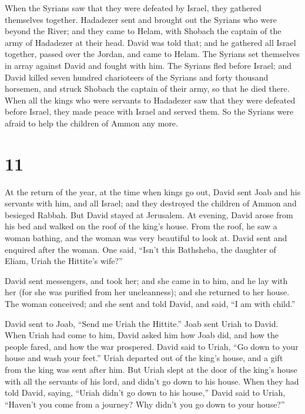  When the Syrians saw that they were defeated by Israel,
they gathered themselves together.  Hadadezer sent and
brought out the Syrians who were beyond the River; and they came to
Helam, with Shobach the captain of the army of Hadadezer at their head.
 David was told that; and he gathered all Israel together,
passed over the Jordan, and came to Helam. The Syrians set themselves in
array against David and fought with him.  The Syrians fled
before Israel; and David killed seven hundred charioteers of the Syrians
and forty thousand horsemen, and struck Shobach the captain of their
army, so that he died there.  When all the kings who were
servants to Hadadezer saw that they were defeated before Israel, they
made peace with Israel and served them. So the Syrians were afraid to
help the children of Ammon any more.

\hypertarget{section-10}{%
\section{11}\label{section-10}}

 At the return of the year, at the time when kings go out,
David sent Joab and his servants with him, and all Israel; and they
destroyed the children of Ammon and besieged Rabbah. But David stayed at
Jerusalem.  At evening, David arose from his bed and walked
on the roof of the king's house. From the roof, he saw a woman bathing,
and the woman was very beautiful to look at.  David sent and
enquired after the woman. One said, ``Isn't this Bathsheba, the daughter
of Eliam, Uriah the Hittite's wife?''

 David sent messengers, and took her; and she came in to
him, and he lay with her (for she was purified from her uncleanness);
and she returned to her house.  The woman conceived; and she
sent and told David, and said, ``I am with child.''

 David sent to Joab, ``Send me Uriah the Hittite.'' Joab
sent Uriah to David.  When Uriah had come to him, David
asked him how Joab did, and how the people fared, and how the war
prospered.  David said to Uriah, ``Go down to your house and
wash your feet.'' Uriah departed out of the king's house, and a gift
from the king was sent after him.  But Uriah slept at the
door of the king's house with all the servants of his lord, and didn't
go down to his house.  When they had told David, saying,
``Uriah didn't go down to his house,'' David said to Uriah, ``Haven't
you come from a journey? Why didn't you go down to your house?''

